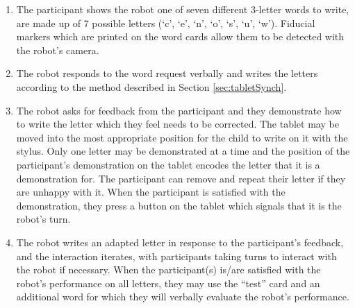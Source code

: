 \documentclass{sig-alternate}
\begin{document}
\begin{enumerate}

    \item The participant shows the robot one of seven different 3-letter words
        to write, are made up of 7 possible letters (`c', `e',
        `n', `o', `s', `u', `w'). Fiducial markers which are printed on the word
        cards allow them to be detected with the robot's camera. 

    \item The robot responds to the word request verbally and writes the
        letters according to the method described in Section \ref{sec:tabletSynch}. 

    \item The robot asks for feedback from the participant and they demonstrate
        how to write the letter which they feel needs to be corrected. The
        tablet may be moved into the most appropriate position for the child to
        write on it with the stylus. Only one letter may be demonstrated at a time and the
        position of the participant's demonstration on the tablet encodes the
        letter that it is a demonstration for. The participant can remove and
        repeat their letter if they are unhappy with it.
        When the participant is satisfied with the demonstration, they press a button on
        the tablet which signals that it is the robot's turn.

    \item The robot writes an adapted letter in 
        response to the participant's feedback, and the interaction iterates,
        with participants taking turns to interact with the robot if necessary.
        When the participant(s) is/are satisfied with the robot's performance on 
	all letters,
        they may use the ``test'' card and an additional word for which they will
        verbally evaluate the robot's performance. 

\end{enumerate}
\end{document}
